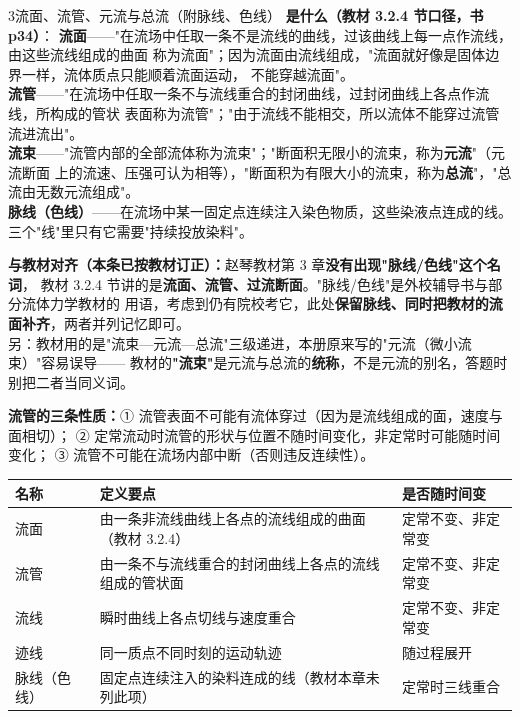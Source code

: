 \begin{kaodian}{3}{流面、流管、元流与总流（附脉线、色线）}
\textbf{是什么（教材 3.2.4 节口径，书 p34）}：
\textbf{流面}——"在流场中任取一条不是流线的曲线，过该曲线上每一点作流线，由这些流线组成的曲面
称为流面"；因为流面由流线组成，"流面就好像是固体边界一样，流体质点只能顺着流面运动，
不能穿越流面"。\\
\textbf{流管}——"在流场中任取一条不与流线重合的封闭曲线，过封闭曲线上各点作流线，所构成的管状
表面称为流管"；"由于流线不能相交，所以流体不能穿过流管流进流出"。\\
\textbf{流束}——"流管内部的全部流体称为流束"；"断面积无限小的流束，称为\textbf{元流}"（元流断面
上的流速、压强可认为相等），"断面积为有限大小的流束，称为\textbf{总流}"，"总流由无数元流组成"。\\
\textbf{脉线（色线）}——在流场中某一固定点连续注入染色物质，这些染液点连成的线。
三个"线"里只有它需要"持续投放染料"。

\begin{tishi}
\textbf{与教材对齐（本条已按教材订正）：}赵琴教材第 3 章\textbf{没有出现"脉线/色线"这个名词}，
教材 3.2.4 节讲的是\textbf{流面、流管、过流断面}。"脉线/色线"是外校辅导书与部分流体力学教材的
用语，考虑到仍有院校考它，此处\textbf{保留脉线、同时把教材的流面补齐}，两者并列记忆即可。\\
另：教材用的是"流束—元流—总流"三级递进，本册原来写的"元流（微小流束）"容易误导——
教材的\textbf{"流束"}是元流与总流的\textbf{统称}，不是元流的别名，答题时别把二者当同义词。
\end{tishi}

\textbf{流管的三条性质：}① 流管表面不可能有流体穿过（因为是流线组成的面，速度与面相切）；
② 定常流动时流管的形状与位置不随时间变化，非定常时可能随时间变化；
③ 流管不可能在流场内部中断（否则违反连续性）。

\begin{center}
\begin{tabularx}{\textwidth}{@{}lXX@{}}
\toprule
名称 & 定义要点 & 是否随时间变 \\
\midrule
流面 & 由一条非流线曲线上各点的流线组成的曲面（教材 3.2.4） & 定常不变、非定常变 \\
流管 & 由一条不与流线重合的封闭曲线上各点的流线组成的管状面 & 定常不变、非定常变 \\
流线 & 瞬时曲线上各点切线与速度重合 & 定常不变、非定常变 \\
迹线 & 同一质点不同时刻的运动轨迹 & 随过程展开 \\
脉线（色线） & 固定点连续注入的染料连成的线（教材本章未列此项） & 定常时三线重合 \\
\bottomrule
\end{tabularx}
\end{center}


\end{kaodian}
